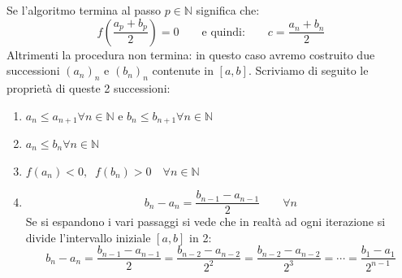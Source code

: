 {\begin{enumerate}
  \end{enumerate}

  Se l'algoritmo termina al passo $p \in \mathbb{N}$ significa che:
  \begin{equation*}
    f\left(\dfrac{a_p + b_p}{2}\right) = 0 \qquad \text{e quindi:} \qquad c = \dfrac{a_n + b_n}{2}
  \end{equation*}
  Altrimenti la procedura non termina: in questo caso avremo costruito due successioni $(a_n)_n$ e $(b_n)_n$ contenute in $[a, b]$. Scriviamo di seguito le proprietà di queste 2 successioni:
  \begin{enumerate}[label=\roman*.]
    \item $a_n \leq a_{n+1} \forall n \in \mathbb{N}$ \quad e \quad $b_n \leq b_{n+1} \forall n \in \mathbb{N}$

    \item $a_n \leq b_n \forall n \in \mathbb{N}$ 
      
    \item $f(a_n) < 0, \;\; f(b_n) > 0 \quad \forall n \in \mathbb{N}$
    
    \item 
      \begin{equation*}
        b_n - a_n = \dfrac{b_{n-1} - a_{n-1}}{2} \qquad \forall n
      \end{equation*}
      Se si espandono i vari passaggi si vede che in realtà ad ogni iterazione si divide l'intervallo iniziale $[a, b]$ in 2:
      \begin{equation*}
        b_n - a_n = \dfrac{b_{n-1} - a_{n-1}}{2} = \dfrac{b_{n-2} - a_{n-2}}{2^2} = \dfrac{b_{n-2} - a_{n-2}}{2^3}  = \cdots = \dfrac{b_1 - a_1}{2^{n-1}}
      \end{equation*}
  \end{enumerate}

}
